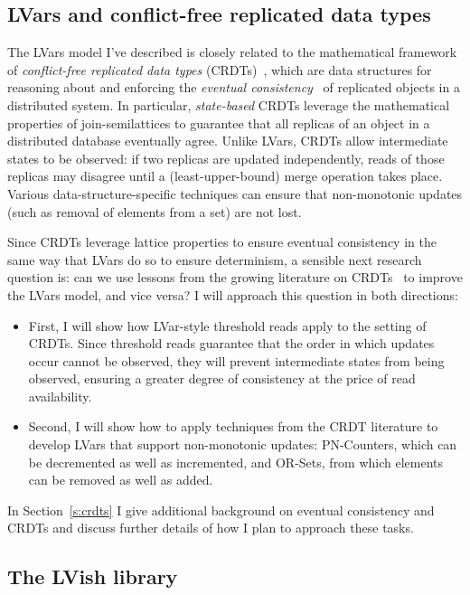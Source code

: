 \documentclass{article}
\begin{document}
\subsection{LVars and conflict-free replicated data types}

The LVars model I've described is closely related to the mathematical
framework of \emph{conflict-free replicated data types}
(CRDTs)~\cite{crdts}, which are data structures for
reasoning about and enforcing the \emph{eventual
  consistency}~\cite{vogels-ec} of replicated objects in a distributed
system.  In particular, \emph{state-based} CRDTs leverage the
mathematical properties of join-semilattices to guarantee that all
replicas of an object in a distributed database eventually agree.
Unlike LVars, CRDTs allow intermediate states to be observed: if two
replicas are updated independently, reads of those replicas may
disagree until a (least-upper-bound) merge operation takes place.
Various data-structure-specific techniques can ensure that
non-monotonic updates (such as removal of elements from a set) are not
lost.

Since CRDTs leverage lattice properties to ensure eventual consistency
in the same way that LVars do so to ensure determinism, a sensible
next research question is: can we use lessons from the growing
literature on CRDTs~\cite{crdts, crdts-tr, rdts-popl14} to
improve the LVars model, and vice versa?  I will approach this
question in both directions:
\begin{itemize}
\item First, I will show how LVar-style threshold reads apply to the
  setting of CRDTs.  Since threshold reads guarantee that the order in
  which updates occur cannot be observed, they will prevent
  intermediate states from being observed, ensuring a greater degree
  of consistency at the price of read availability.
\item Second, I will show how to apply techniques from the CRDT
  literature to develop LVars that support non-monotonic updates:
  PN-Counters, which can be decremented as well as incremented, and
  OR-Sets, from which elements can be removed as well as added.
\end{itemize}
In Section~\ref{s:crdts} I give additional background on eventual
consistency and CRDTs and discuss further details of how I plan to
approach these tasks.

\subsection{The LVish library}
\end{document}
